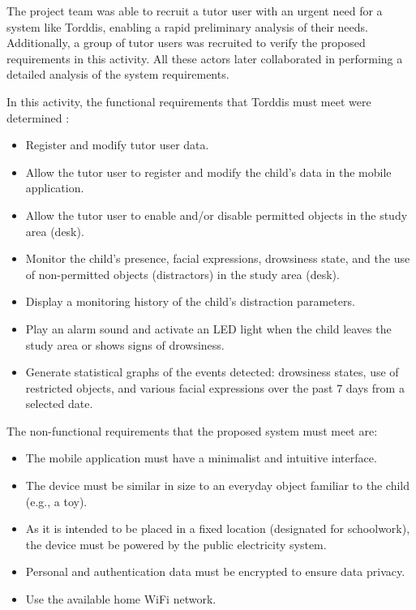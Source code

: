 				The project team was able to recruit a tutor user with an urgent need for a system like Torddis, enabling a rapid preliminary analysis of their needs. Additionally, a group of tutor users was recruited to verify the proposed requirements in this activity. All these actors later collaborated in performing a detailed analysis of the system requirements.
				
				In this activity, the functional requirements that Torddis must meet were determined \citep{Asish2022Detecting,Pabba2022AnIntelligent,Vettivel2018System}:
				
				\begin{itemize}
					\item Register and modify tutor user data.
					
					\item Allow the tutor user to register and modify the child’s data in the mobile application.
					
					\item Allow the tutor user to enable and/or disable permitted objects in the study area (desk).
					
					\item Monitor the child's presence, facial expressions, drowsiness state, and the use of non-permitted objects (distractors) in the study area (desk).
					
					\item Display a monitoring history of the child’s distraction parameters.
					
					\item Play an alarm sound and activate an LED light when the child leaves the study area or shows signs of drowsiness.
					
					\item Generate statistical graphs of the events detected: drowsiness states, use of restricted objects, and various facial expressions over the past 7 days from a selected date.
				\end{itemize}
				
				The non-functional requirements that the proposed system must meet are:
				
				\begin{itemize}
					\item The mobile application must have a minimalist and intuitive interface.
					
					\item The device must be similar in size to an everyday object familiar to the child (e.g., a toy).
					
					\item As it is intended to be placed in a fixed location (designated for schoolwork), the device must be powered by the public electricity system.
					
					\item Personal and authentication data must be encrypted to ensure data privacy.
					
					\item Use the available home WiFi network.
				\end{itemize}
				
